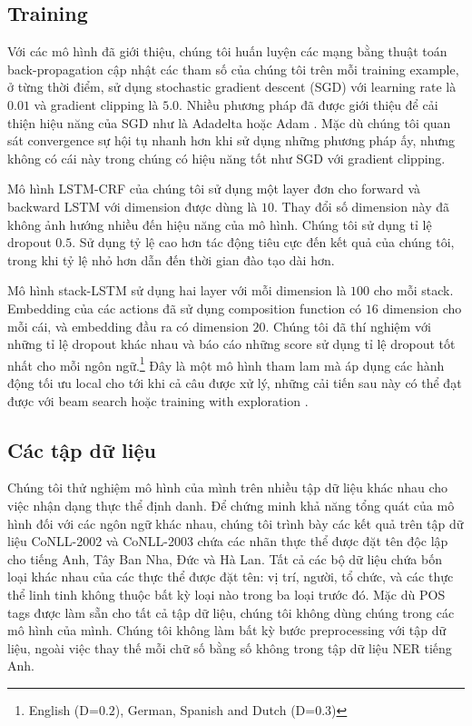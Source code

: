 \documentclass[11pt,letterpaper]{article}
\begin{document}
\subsection{Training}

Với các mô hình đã giới thiệu, chúng tôi huấn luyện các mạng bằng thuật toán back-propagation cập nhật các tham số của chúng tôi trên mỗi training example, ở từng thời điểm, sử dụng stochastic gradient descent (SGD) với learning rate là $0.01$ và gradient clipping là $5.0$. Nhiều phương pháp đã được giới thiệu để cải thiện hiệu năng của SGD như là Adadelta \cite{adadelta} hoặc Adam \cite{adam}. Mặc dù chúng tôi quan sát convergence sự hội tụ nhanh hơn khi sử dụng những phương pháp ấy, nhưng không có cái này trong chúng có hiệu năng tốt như SGD với gradient clipping.

Mô hình LSTM-CRF của chúng tôi sử dụng một layer đơn cho forward và backward LSTM với dimension được dùng là $10$. Thay đổi số dimension này đã không ảnh hướng nhiều đến hiệu năng của mô hình. Chúng tôi sử dụng tỉ lệ dropout $0.5$. Sử dụng tỷ lệ cao hơn tác động tiêu cực đến kết quả của chúng tôi, trong khi tỷ lệ nhỏ hơn dẫn đến thời gian đào tạo dài hơn.

Mô hình stack-LSTM sử dụng hai layer với mỗi dimension là $100$ cho mỗi stack. Embedding của các actions đã sử dụng composition function có $16$ dimension cho mỗi cái, và embedding đầu ra có dimension $20$. Chúng tôi đã thí nghiệm với những tỉ lệ dropout khác nhau và báo cáo những score sử dụng tỉ lệ dropout tốt nhất cho mỗi ngôn ngữ.\footnote{English (D=$0.2$), German, Spanish and Dutch (D=$0.3$)} Đây là một mô hình tham lam mà áp dụng các hành động tối ưu local cho tới khi cả câu được xử lý, những cải tiến sau này có thể đạt được với beam search \cite{zhang:2011} hoặc training with exploration \cite{ballesteros-arxiv16}.

\subsection{Các tập dữ liệu}

Chúng tôi thử nghiệm mô hình của mình trên nhiều tập dữ liệu khác nhau cho việc nhận dạng thực thể định danh. Để chứng minh khả năng tổng quát của mô hình đối với các ngôn ngữ khác nhau, chúng tôi trình bày các kết quả trên tập dữ liệu CoNLL-2002 và CoNLL-2003 \cite{TjongKimSang:2002:ICS:1118853.1118877,TjongKimSang-DeMeulder:2003:CONLL} chứa các nhãn thực thể được đặt tên độc lập cho tiếng Anh, Tây Ban Nha, Đức và Hà Lan. Tất cả các bộ dữ liệu chứa bốn loại khác nhau của các thực thể được đặt tên: vị trí, người, tổ chức, và các thực thể linh tinh không thuộc bất kỳ loại nào trong ba loại trước đó. Mặc dù POS tags được làm sẵn cho tất cả tập dữ liệu, chúng tôi không dùng chúng trong các mô hình của mình. Chúng tôi không làm bất kỳ bước preprocessing với tập dữ liệu, ngoài việc thay thế mỗi chữ số bằng số không trong tập dữ liệu NER tiếng Anh.
\end{document}
